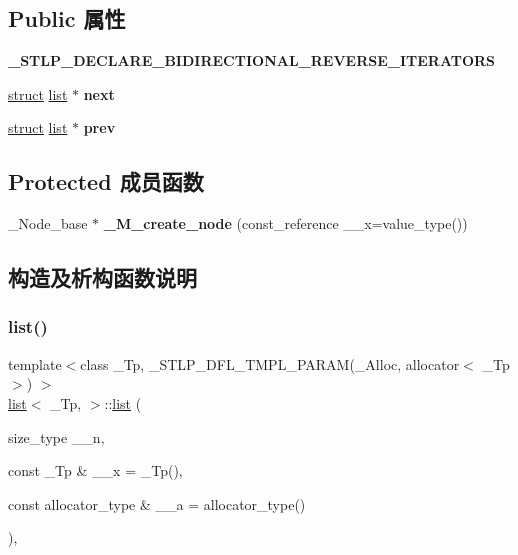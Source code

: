 \subsection*{Public 属性}
\begin{DoxyCompactItemize}
\item 
\mbox{\label{classlist_a4e0a3653bd13fa33416ada63c784a183}} 
{\bfseries \+\_\+\+S\+T\+L\+P\+\_\+\+D\+E\+C\+L\+A\+R\+E\+\_\+\+B\+I\+D\+I\+R\+E\+C\+T\+I\+O\+N\+A\+L\+\_\+\+R\+E\+V\+E\+R\+S\+E\+\_\+\+I\+T\+E\+R\+A\+T\+O\+RS}
\item 
\mbox{\label{classlist_a37a5c3849498f3f75b6eb818eaef5cdd}} 
\hyperlink{interfacestruct}{struct} \hyperlink{classlist}{list} $\ast$ {\bfseries next}
\item 
\mbox{\label{classlist_ab233f73cc6e41c9be81004de0d8cc23b}} 
\hyperlink{interfacestruct}{struct} \hyperlink{classlist}{list} $\ast$ {\bfseries prev}
\end{DoxyCompactItemize}
\subsection*{Protected 成员函数}
\begin{DoxyCompactItemize}
\item 
\mbox{\label{classlist_ac35b3d0ede05481e8442d90ce5c8b31e}} 
\+\_\+\+Node\+\_\+base $\ast$ {\bfseries \+\_\+\+M\+\_\+create\+\_\+node} (const\+\_\+reference \+\_\+\+\_\+x=value\+\_\+type())
\end{DoxyCompactItemize}


\subsection{构造及析构函数说明}
\mbox{\label{classlist_a25456fb5186db57fdb442fa996346315}} 
\subsubsection{\texorpdfstring{list()}{list()}}
{\footnotesize\ttfamily template$<$class \+\_\+\+Tp, \+\_\+\+S\+T\+L\+P\+\_\+\+D\+F\+L\+\_\+\+T\+M\+P\+L\+\_\+\+P\+A\+R\+A\+M(\+\_\+\+Alloc, allocator$<$ \+\_\+\+Tp $>$) $>$ \\
\hyperlink{classlist}{list}$<$ \+\_\+\+Tp, $>$\+::\hyperlink{classlist}{list} (\begin{DoxyParamCaption}\item[{size\+\_\+type}]{\+\_\+\+\_\+n,  }\item[{const \+\_\+\+Tp \&}]{\+\_\+\+\_\+x = {\ttfamily \+\_\+Tp()},  }\item[{const allocator\+\_\+type \&}]{\+\_\+\+\_\+a = {\ttfamily allocator\+\_\+type()} }\end{DoxyParamCaption})\hspace{0.3cm}{\ttfamily [inline]}, {\ttfamily [explicit]}}


